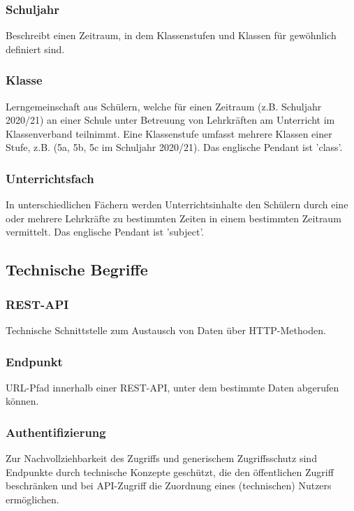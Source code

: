 \subsubsection*{Schuljahr}
Beschreibt einen Zeitraum, in dem Klassenstufen und Klassen für gewöhnlich definiert sind.

\subsubsection*{Klasse}
Lerngemeinschaft aus Schülern, welche für einen Zeitraum (z.B. Schuljahr 2020/21) an einer Schule unter Betreuung von Lehrkräften am Unterricht im Klassenverband teilnimmt. Eine Klassenstufe umfasst mehrere Klassen einer Stufe, z.B. (5a, 5b, 5c im Schuljahr 2020/21). Das englische Pendant ist 'class'.


\subsubsection*{Unterrichtsfach}
In unterschiedlichen Fächern werden Unterrichtsinhalte den Schülern durch eine oder mehrere Lehrkräfte zu bestimmten Zeiten in einem bestimmten Zeitraum vermittelt. Das englische Pendant ist 'subject'.

\subsection{Technische Begriffe}

\subsubsection*{REST-API}

Technische Schnittstelle zum Austausch von Daten über HTTP-Methoden.

\subsubsection*{Endpunkt}

URL-Pfad innerhalb einer REST-API, unter dem bestimmte Daten abgerufen können.

\subsubsection*{Authentifizierung}

Zur Nachvollziehbarkeit des Zugriffs und generischem Zugriffsschutz sind Endpunkte durch technische Konzepte geschützt, die den öffentlichen Zugriff beschränken und bei API-Zugriff die Zuordnung eines (technischen) Nutzers ermöglichen.
 
